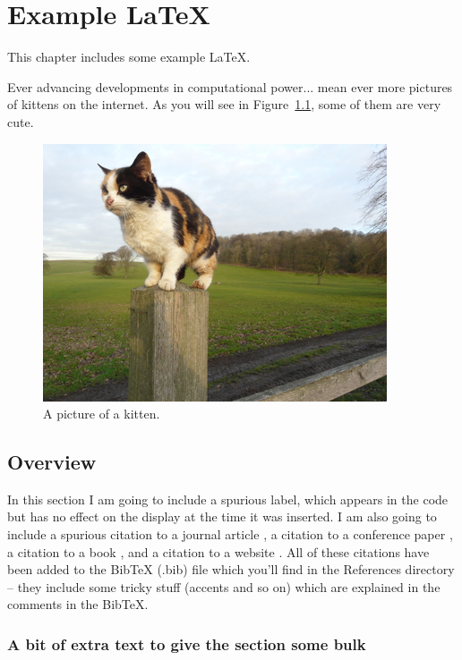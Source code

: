 \chapter{Example \LaTeX}

This chapter includes some example \LaTeX. 

Ever advancing developments in computational power... mean ever more pictures
of kittens on the internet. As you will see in Figure~\ref{fig:kittenpicture},
some of them are very cute.

\begin{figure}[H]
\includegraphics{Chapter7/kitten}
\caption{A picture of a kitten\cite{kittenpic_ref}.}
\label{fig:kittenpicture}
\end{figure}

\section{Overview}

In this section I am going to include a spurious label\label{spurious}, which
appears in the code but has no effect on the display at the time it was
inserted.  I am also going to include a spurious citation to a journal
article \cite{HannahsPaper}, a citation to a conference paper \cite{MarksPaper},
a citation to a book \cite{NumericalRecipes}, and a citation to a
website \cite{FailBlog}. All of these citations have been added to the BibTeX
(.bib) file which you'll find in the References directory -- they include some
tricky stuff (accents and so on) which are explained in the comments in the
BibTeX.


\subsection{A bit of extra text to give the section some bulk}

